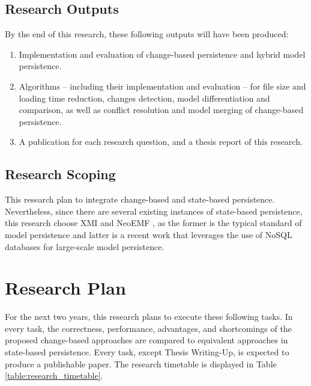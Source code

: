 \documentclass[12pt, a4paper]{report} \usepackage[titletoc]{appendix}
\begin{document}
\section{Research Outputs}
\label{sec:research_outputs}
By the end of this research, these following outputs will have been produced:
\begin{enumerate}
	\item Implementation and evaluation of change-based persistence and hybrid model persistence.
	\item Algorithms -- including their implementation and evaluation -- for file size and loading time reduction, changes detection, model differentiation and comparison, as well as conflict resolution and model merging of change-based persistence.
	\item A publication for each research question, and a thesis report of this research. 
\end{enumerate}


\section{Research Scoping}
\label{sec:research_scoping}
This research plan to integrate change-based and state-based persistence. Nevertheless, since there are several existing instances of state-based persistence,  this research choose XMI and NeoEMF \cite{daniel2016neoemf}, as the former is the typical standard of  model persistence and latter is a recent work that leverages the use of NoSQL databases for large-scale model persistence. 

\chapter{Research Plan}
\label{ch:research_plan}
For the next two years, this research plans to execute these following tasks. In every task, the correctness, performance, advantages, and shortcomings of the proposed change-based approaches are compared to equivalent approaches in state-based persistence. Every task, except Thesis Writing-Up, is expected to produce a publishable paper. The research timetable is displayed in Table \ref{table:research_timetable}.
\end{document}
